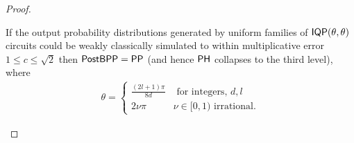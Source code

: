\begin{proof}
\begin{theorem}\label{thm:iqphardnessfujii}
If the output probability distributions generated by uniform families of $\operatorname{\textsf{IQP}}(\theta, \theta)$ circuits
could be weakly classically simulated to within multiplicative error $1 \leq c \leq \sqrt{2}$ then $\operatorname{\textsf{PostBPP}} = \operatorname{\textsf{PP}}$ (and hence $\operatorname{\textsf{PH}}$ collapses to the third level), where 
\begin{align}
\theta = \begin{cases}
\frac{(2l+1)\pi}{8d} &\text{ for integers, } d, l\\
 2\nu \pi& \nu \in[0,1) \text{ irrational.}
 \end{cases}\label{hardparametervaluesiqp}
\end{align}
\end{theorem}


\end{proof}
